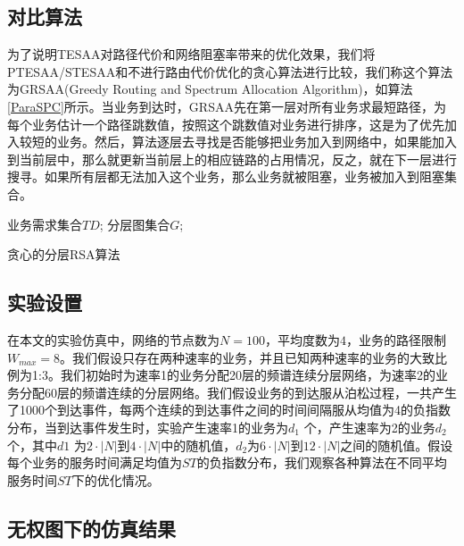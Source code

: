 \subsection{对比算法}
为了说明TESAA对路径代价和网络阻塞率带来的优化效果，我们将PTESAA/STESAA和不进行路由代价优化的贪心算法进行比较，我们称这个算法为GRSAA(Greedy Routing and Spectrum Allocation Algorithm)，如算法\ref{ParaSPC}所示。当业务到达时，GRSAA先在第一层对所有业务求最短路径，为每个业务估计一个路径跳数值，按照这个跳数值对业务进行排序，这是为了优先加入较短的业务。然后，算法逐层去寻找是否能够把业务加入到网络中，如果能加入到当前层中，那么就更新当前层上的相应链路的占用情况，反之，就在下一层进行搜寻。如果所有层都无法加入这个业务，那么业务就被阻塞，业务被加入到阻塞集合。
\begin{algorithm}[t]
\begin{algorithmic}[1]
\Require
业务需求集合$TD$;
分层图集合$G$;
\EndIf
\EndFor
{}
\EndIf
\EndFor
\EndFor
\EndFor
\end{algorithmic}
\caption{{贪心的分层RSA算法}}
\label{ParaSPC}
\end{algorithm}
\subsection{实验设置}
在本文的实验仿真中，网络的节点数为$N=100$，平均度数为$4$，业务的路径限制$W_{max}=8$。我们假设只存在两种速率的业务，并且已知两种速率的业务的大致比例为1:3。我们初始时为速率1的业务分配20层的频谱连续分层网络，为速率2的业务分配60层的频谱连续的分层网络。我们假设业务的到达服从泊松过程，一共产生了1000个到达事件，每两个连续的到达事件之间的时间间隔服从均值为4的负指数分布，当到达事件发生时，实验产生速率1的业务为$d_1$ 个，产生速率为2的业务$d_2$ 个，其中$d1$ 为$2 \cdot |N|$到$4 \cdot|N|$中的随机值，$d_2$为$6 \cdot |N|$到$12 \cdot |N|$之间的随机值。假设每个业务的服务时间满足均值为$ST$的负指数分布，我们观察各种算法在不同平均服务时间$ST$下的优化情况。

\subsection{无权图下的仿真结果}
